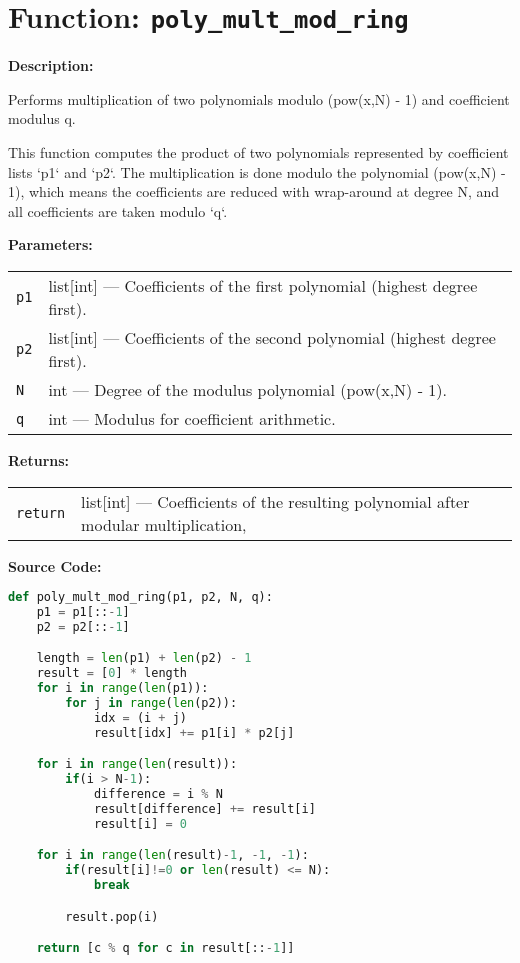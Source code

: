 \documentclass[a4paper,12pt]{article}
\begin{document}
\section*{Function: \texttt{poly\_mult\_mod\_ring}}

\textbf{Description:}

Performs multiplication of two polynomials modulo (pow(x,N) - 1) and coefficient modulus q.

This function computes the product of two polynomials represented by coefficient lists `p1` and `p2`.
The multiplication is done modulo the polynomial (pow(x,N) - 1), which means the coefficients
are reduced with wrap-around at degree N, and all coefficients are taken modulo `q`.

\vspace{1em}

\textbf{Parameters:}

\vspace{1em}
\noindent
\begin{tabular}{p{3cm} p{11cm}}
\texttt{p1} & list[int] — Coefficients of the first polynomial (highest degree first). \\
\texttt{p2} & list[int] — Coefficients of the second polynomial (highest degree first). \\
\texttt{N} & int — Degree of the modulus polynomial (pow(x,N) - 1). \\
\texttt{q} & int — Modulus for coefficient arithmetic. \\
\end{tabular}

\vspace{1em}
\noindent
\textbf{Returns:}

\begin{tabular}{p{3cm} p{11cm}}
\texttt{return} & list[int] — Coefficients of the resulting polynomial after modular multiplication, \\
\end{tabular}

\vspace{1em}
\textbf{Source Code:}

\begin{lstlisting}[language=Python]
def poly_mult_mod_ring(p1, p2, N, q):
    p1 = p1[::-1]
    p2 = p2[::-1]

    length = len(p1) + len(p2) - 1
    result = [0] * length
    for i in range(len(p1)):
        for j in range(len(p2)):
            idx = (i + j)
            result[idx] += p1[i] * p2[j]

    for i in range(len(result)):
        if(i > N-1):
            difference = i % N
            result[difference] += result[i]
            result[i] = 0

    for i in range(len(result)-1, -1, -1):
        if(result[i]!=0 or len(result) <= N):
            break

        result.pop(i)

    return [c % q for c in result[::-1]]
\end{lstlisting}
\end{document}
